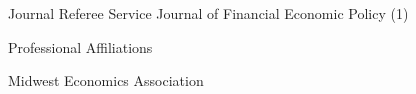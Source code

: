\documentclass{resume} %
\begin{document}
\begin{rSection}{Journal Referee Service}
	Journal of Financial Economic Policy (1)
\end{rSection}

\begin{rSection}{Professional Affiliations}


	Midwest Economics Association
\end{rSection}




 	
 


\end{document}
